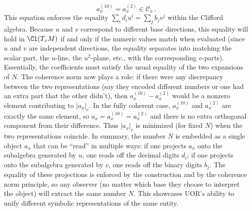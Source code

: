 \documentclass[12pt]{article}
\begin{document}
\begin{itemize}
    \[
        a_x^{(10)} = a_x^{(2)} \in \mathcal{C}_x\,.
    \] 
    This equation enforces the equality $\sum_i d_i u^i = \sum_j b_j v^j$ within the Clifford algebra. Because $u$ and $v$ correspond to different base directions, this equality will hold in $\Cl(T_xM)$ if and only if the numeric values match when evaluated (since $u$ and $v$ are independent directions, the equality separates into matching the scalar part, the $u$-line, the $u^2$-plane, etc., with the corresponding $v$-parts). Essentially, the coefficients must satisfy the usual equality of the two expansions of $N$. The coherence norm now plays a role: if there were any discrepancy between the two representations (say they encoded different numbers or one had an extra part that the other didn’t), then $a_x^{(10)} - a_x^{(2)}$ would be a nonzero element contributing to $|a_x|_c$. In the fully coherent case, $a_x^{(10)}$ and $a_x^{(2)}$ are exactly the same element, so $a_x = a_x^{(10)} = a_x^{(2)}$ and there is no extra orthogonal component from their difference. Thus $|a_x|_c$ is minimized (for fixed $N$) when the two representations coincide. In summary, the number $N$ is embedded as a single object $a_x$ that can be “read” in multiple ways: if one projects $a_x$ onto the subalgebra generated by $u$, one reads off the decimal digits $d_i$; if one projects onto the subalgebra generated by $v$, one reads off the binary digits $b_j$. The equality of these projections is enforced by the construction and by the coherence norm principle, so any observer (no matter which base they choose to interpret the object) will extract the same number $N$. This showcases UOR’s ability to unify different symbolic representations of the same entity.


\end{itemize}
\end{document}
